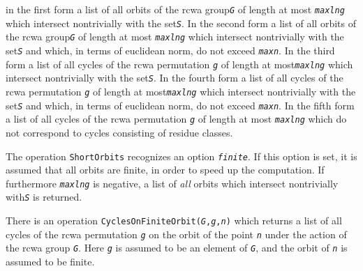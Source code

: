 \documentclass[a4paper,11pt]{report}
\begin{document}
{{{ in the first form a list of all orbits of the rcwa group{\nobreakspace}\mbox{\texttt{\mdseries\slshape G}} of length at most \mbox{\texttt{\mdseries\slshape maxlng}} which intersect non\texttt{}trivially with the set{\nobreakspace}\mbox{\texttt{\mdseries\slshape S}}. In the second form a list of all orbits of the rcwa group{\nobreakspace}\mbox{\texttt{\mdseries\slshape G}} of length at most \mbox{\texttt{\mdseries\slshape maxlng}} which intersect non\texttt{}trivially with the set{\nobreakspace}\mbox{\texttt{\mdseries\slshape S}} and which, in terms of euclidean norm, do not exceed \mbox{\texttt{\mdseries\slshape maxn}}. In the third form a list of all cycles of the rcwa permutation \mbox{\texttt{\mdseries\slshape g}} of length at most{\nobreakspace}\mbox{\texttt{\mdseries\slshape maxlng}} which intersect non\texttt{}trivially with the set{\nobreakspace}\mbox{\texttt{\mdseries\slshape S}}. In the fourth form a list of all cycles of the rcwa permutation \mbox{\texttt{\mdseries\slshape g}} of length at most{\nobreakspace}\mbox{\texttt{\mdseries\slshape maxlng}} which intersect non\texttt{}trivially with the set{\nobreakspace}\mbox{\texttt{\mdseries\slshape S}} and which, in terms of euclidean norm, do not exceed \mbox{\texttt{\mdseries\slshape maxn}}. In the fifth form a list of all cycles of the rcwa permutation \mbox{\texttt{\mdseries\slshape g}} of length at most \mbox{\texttt{\mdseries\slshape maxlng}} which do not correspond to cycles consisting of residue classes. 



 The operation \texttt{ShortOrbits} recognizes an option \mbox{\texttt{\mdseries\slshape finite}}. If this option is set, it is assumed that all orbits are finite, in order to
speed up the computation. If furthermore \mbox{\texttt{\mdseries\slshape maxlng}} is negative, a list of \emph{all} orbits which intersect non\texttt{}trivially with{\nobreakspace}\mbox{\texttt{\mdseries\slshape S}} is returned. 

  There is an operation \texttt{CyclesOnFiniteOrbit(}\mbox{\texttt{\mdseries\slshape G}}\texttt{,}\mbox{\texttt{\mdseries\slshape g}}\texttt{,}\mbox{\texttt{\mdseries\slshape n}}\texttt{)} which returns a list of all cycles of the rcwa permutation \mbox{\texttt{\mdseries\slshape g}} on the orbit of the point \mbox{\texttt{\mdseries\slshape n}} under the action of the rcwa group \mbox{\texttt{\mdseries\slshape G}}. Here \mbox{\texttt{\mdseries\slshape g}} is assumed to be an element of \mbox{\texttt{\mdseries\slshape G}}, and the orbit of \mbox{\texttt{\mdseries\slshape n}} is assumed to be finite. 
\begin{Verbatim}[commandchars=!@|,fontsize=\small,frame=single,label=Example]
  

\end{Verbatim}}}}
\end{document}
